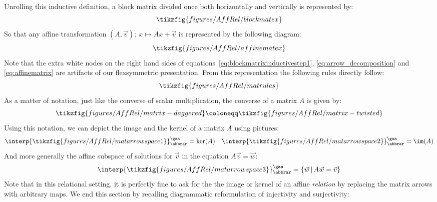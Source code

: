 Unrolling this inductive definition, a block matrix divided once both horizontally and vertically is represented by:
\begin{equation}
  \label{eq:arrow_decomposition}
  \tikzfig{figures/AffRel/blockmatex}
\end{equation}
So that any affine transformation \((A,\vec v);\ x\mapsto Ax + \vec v \) is represented by the following diagram:
\begin{equation}
  \label{eq:affinematrix}
  \tikzfig{figures/AffRel/affinematex}
\end{equation}
Note that the extra white nodes on the right hand sides of equations~\eqref{eq:blockmatrixinductivestep1}, \eqref{eq:arrow_decomposition} and \eqref{eq:affinematrix} are artifacts of our flexsymmetric presentation. From this representation the following rules directly follow:
\begin{equation}
	\label{matrules}\tikzfig{figures/AffRel/matrules}
\end{equation}
As a matter of notation, just like the converse of scalar multiplication, the converse of a matrix \(A\) is given by:
\begin{equation}
  \tikzfig{figures/AffRel/matrix-daggered}
  \coloneqq 
  \tikzfig{figures/AffRel/matrix-twisted}
\end{equation}
Using this notation, we can depict the image and the kernel of a matrix \(A\) using pictures:
\begin{equation}
  \interp{\tikzfig{figures/AffRel/matarrowspace1}}^{\gaa}_{\abbrar}=\ker(A)\quad\interp{\tikzfig{figures/AffRel/matarrowspace2}}^{\gaa}_{\abbrar}=\im(A)
\end{equation}
And more generally the affine subspace of solutions for \(\vec v\) in the  equation \(A\vec v=\vec w\):
\begin{equation}
  \interp{\tikzfig{figures/AffRel/matarrowspace3}}^{\gaa}_{\abbrar}=\left\{\vec w \,\middle|\,  A \vec w=\vec v\right\}
\end{equation}
Note that in this relational setting, it is perfectly fine to ask for the the image or kernel of an affine {\em relation} by replacing the matrix arrows with arbitrary maps.
We end this section by recalling diagrammatic reformulation of injectivity and surjectivity:
